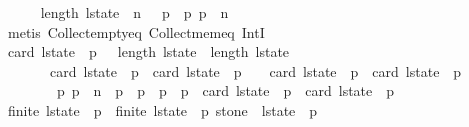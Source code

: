 \begin{isabellebody}
\ \ \ \ \isamarkupfalse%
\ {\isacharbackquoteopen}length\ l{\isacharunderscore}state\ {\isacharequal}\ n\ {\isacharplus}\ {}{\isacharbackquoteclose}\ {\isacharbackquoteopen}p{}\ {\isacharless}\ p{}{\isacharbackquoteclose}\ {\isacharbackquoteopen}p{}\ {\isasymle}\ n{\isacharbackquoteclose}\isanewline
\ \ \ \ \isamarkupfalse%
\ {\isacharparenleft}metis\ Collect{\isacharunderscore}empty{\isacharunderscore}eq\ Collect{\isacharunderscore}mem{\isacharunderscore}eq\ IntI{\isacharparenright}\isanewline
\isanewline
\ \ \isamarkupfalse%
\ {\isachardoublequoteopen}card\ {\isacharparenleft}l{\isacharunderscore}state\ {\isacharbang}\ p{}{\isacharparenright}\ {\isachargreater}\ {}{\isachardoublequoteclose}\ {\isachardoublequoteopen}length\ l{\isacharunderscore}state{\isacharprime}\ {\isacharequal}\ length\ l{\isacharunderscore}state{\isachardoublequoteclose}\isanewline
\ \ \ \ \ \ \ {\isachardoublequoteopen}card\ {\isacharparenleft}l{\isacharunderscore}state{\isacharprime}\ {\isacharbang}\ p{}{\isacharparenright}\ {\isacharequal}\ card\ {\isacharparenleft}l{\isacharunderscore}state\ {\isacharbang}\ p{}{\isacharparenright}\ {\isacharminus}\ {}{\isachardoublequoteclose}\ \ {\isachardoublequoteopen}card\ {\isacharparenleft}l{\isacharunderscore}state{\isacharprime}\ {\isacharbang}\ p{}{\isacharparenright}\ {\isacharequal}\ card\ {\isacharparenleft}l{\isacharunderscore}state\ {\isacharbang}\ p{}{\isacharparenright}\ {\isacharplus}\ {}{\isachardoublequoteclose}\isanewline
\ \ \ \ \ \ \ {\isachardoublequoteopen}{\isasymforall}\ p{\isachardot}\ p\ {\isasymle}\ n\ {\isasymand}\ p\ {\isasymnoteq}\ p{}\ {\isasymand}\ p\ {\isasymnoteq}\ p{}\ {\isasymlongrightarrow}\ card\ {\isacharparenleft}l{\isacharunderscore}state{\isacharprime}\ {\isacharbang}\ p{\isacharparenright}\ {\isacharequal}\ card\ {\isacharparenleft}l{\isacharunderscore}state\ {\isacharbang}\ p{\isacharparenright}{\isachardoublequoteclose}\isanewline
\ \ \ \ \isamarkupfalse%
\ {\isacharbackquoteopen}finite\ {\isacharparenleft}l{\isacharunderscore}state\ {\isacharbang}\ p{}{\isacharparenright}\ {\isasymand}\ finite\ {\isacharparenleft}l{\isacharunderscore}state\ {\isacharbang}\ p{}{\isacharparenright}{\isacharbackquoteclose}\ {\isacharbackquoteopen}stone\ {\isasymin}\ l{\isacharunderscore}state\ {\isacharbang}\ p{}{\isacharbackquoteclose}\ \isanewline

\end{isabellebody}
